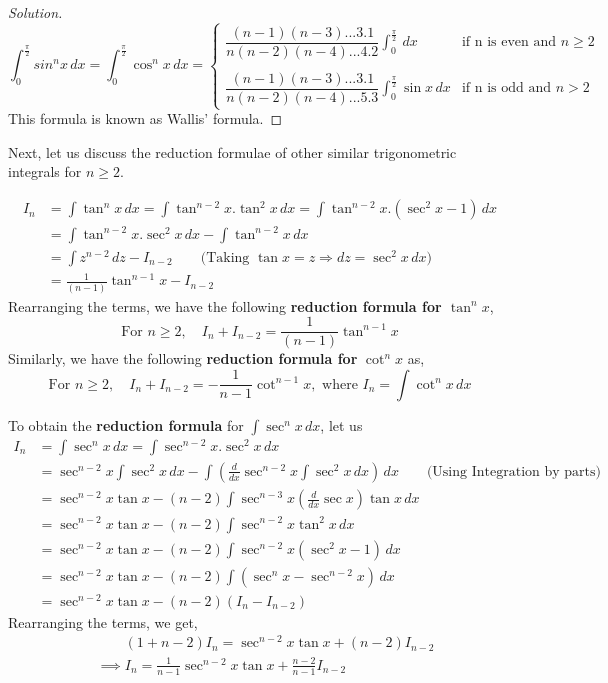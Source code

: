 \documentclass{book}
\theoremstyle{definition}
\newenvironment{solution}
    {\begin{proof}[Solution]}
    {\end{proof}}
\begin{document}
\begin{solution}
\begin{equation*}
\displaystyle\int_0^{\frac{\pi}{2}} sin^n x\,dx=\displaystyle\int_0^{\frac{\pi}{2}} \cos^n x\,dx= 
\begin{cases}
    \dfrac{(n-1)(n-3)...3.1}{n(n-2)(n-4)...4.2}\displaystyle\int_0^{\frac{\pi}{2}}\,dx     & \text{if n is even and }n\geq2     \\\\
    \dfrac{(n-1)(n-3)...3.1}{n(n-2)(n-4)...5.3}\displaystyle\int_0^{\frac{\pi}{2}}\sin x\,dx    & \text{if n is odd and }n>2  
\end{cases}    
\end{equation*}
This formula is known as Wallis' formula. 
\end{solution}

Next, let us discuss the reduction formulae of other similar trigonometric integrals for $n\geq 2$.

\begin{align*}
    I_n&=\int\tan^n x\,dx=\int\tan^{n-2} x.\tan^2 x\,dx=\int\tan^{n-2} x.(\sec^2 x-1)\,dx \\
    &= \int\tan^{n-2} x.\sec^2 x\,dx-\int\tan^{n-2} x\,dx \\
    &= \int z^{n-2}\,dz-I_{n-2} \qquad \text{(Taking $\tan x=z \Rightarrow dz = \sec^2 x\,dx$)} \\
    &= \frac{1}{(n-1)}\tan^{n-1}x-I_{n-2}
\end{align*}
Rearranging the terms, we have the following \textbf{reduction formula for $\tan^n x$},
\[
\text{For } n\geq2, \quad I_n + I_{n-2} = \frac{1}{(n-1)}\tan^{n-1}x
\]
Similarly, we have the following \textbf{reduction formula for} $\cot^nx$ as,
\[
\text{For } n\geq2, \quad I_n+I_{n-2}=-\frac{1}{{n-1}}\cot^{n-1}x, \text{ where } I_n = \int \cot^n x\, dx
\]

To obtain the \textbf{reduction formula} for $\displaystyle\int\sec^nx\,dx$, let us 
\begin{align*}
I_n &= \int\sec^nx\,dx = \int\sec^{n-2}x.\sec^2x\,dx \\
&= \sec^{n-2}x\int\sec^2x\,dx-\int\left(\frac{d}{dx}\sec^{n-2}x \int\sec^2x\,dx\right)\,dx \qquad \text{(Using Integration by parts)} \\
&= \sec^{n-2}x\tan x-(n-2)\int\sec^{n-3}x\left(\frac{d}{dx}\sec x\right)\tan x\,dx \\
&= \sec^{n-2}x\tan x-(n-2) \int\sec^{n-2}x\tan^2x \,dx \\
&= \sec^{n-2}x\tan x-(n-2)\int\sec^{n-2}x(\sec^2x-1) \,dx \\
&= \sec^{n-2}x\tan x-(n-2)\int(\sec^nx-\sec^{n-2}x) \,dx \\ 
&=\sec^{n-2}x\tan x-(n-2)(I_n-I_{n-2})
\end{align*}
Rearranging the terms, we get, 
\begin{align*}
&\qquad (1+n-2)I_n=\sec^{n-2}x\tan x+(n-2)I_{n-2} \\
&\implies I_n= \frac{1}{n-1}\sec^{n-2}x\tan x+\frac{n-2}{n-1}I_{n-2}
\end{align*}
\end{document}
